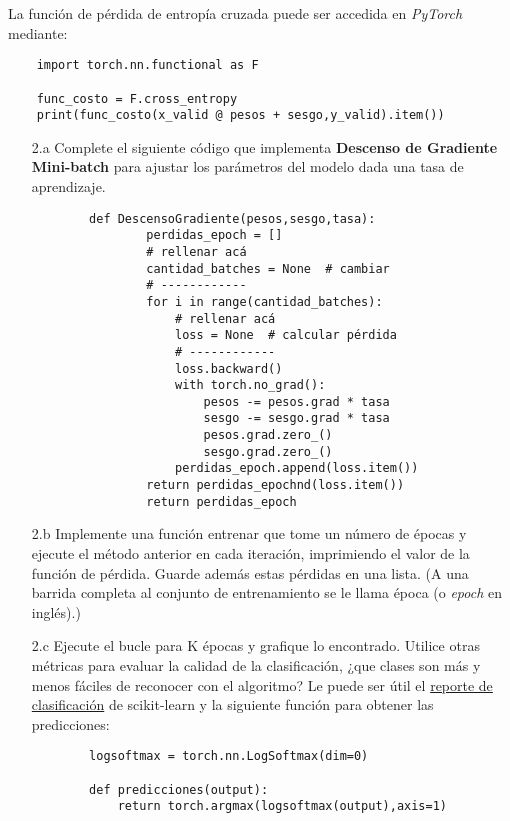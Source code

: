 La función de pérdida de entropía cruzada puede ser accedida en \textit{PyTorch} mediante:

\begin{verbatim}
    import torch.nn.functional as F

    func_costo = F.cross_entropy
    print(func_costo(x_valid @ pesos + sesgo,y_valid).item())
\end{verbatim}

\begin{enumerate}
	\item[2.a] Complete el siguiente código que implementa \textbf{Descenso de Gradiente Mini-batch} para ajustar los parámetros del modelo dada una tasa de aprendizaje.
	\begin{verbatim}
	    def DescensoGradiente(pesos,sesgo,tasa):
                perdidas_epoch = []
                # rellenar acá
                cantidad_batches = None  # cambiar
                # ------------
                for i in range(cantidad_batches):
                    # rellenar acá
                    loss = None  # calcular pérdida
                    # ------------
                    loss.backward()
                    with torch.no_grad():
                        pesos -= pesos.grad * tasa
                        sesgo -= sesgo.grad * tasa
                        pesos.grad.zero_()
                        sesgo.grad.zero_()
                    perdidas_epoch.append(loss.item())
                return perdidas_epochnd(loss.item())
                return perdidas_epoch
    \end{verbatim}
    \item[2.b] Implemente una función entrenar que tome un número de épocas y ejecute el método anterior en cada iteración, imprimiendo el valor de la función de pérdida. Guarde además estas pérdidas en una lista. (A una barrida completa al conjunto de entrenamiento se le llama época (o \textit{epoch} en inglés).)
    \item[2.c] Ejecute el bucle para K épocas y grafique lo encontrado. Utilice otras métricas para evaluar la calidad de la clasificación, ¿que clases son más y menos fáciles de reconocer con el algoritmo? Le puede ser útil el \href{https://scikit-learn.org/stable/modules/generated/sklearn.metrics.classification_report.html}{reporte de clasificación} de scikit-learn y la siguiente función para obtener las predicciones:
    \begin{verbatim}
        logsoftmax = torch.nn.LogSoftmax(dim=0)

        def predicciones(output):
            return torch.argmax(logsoftmax(output),axis=1)
    \end{verbatim}
\end{enumerate}

